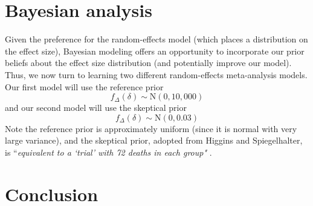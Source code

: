 \documentclass[fleqn,10pt]{SelfArx} %
\begin{document}

\section{Bayesian analysis}

Given the preference for the random-effects model (which places a distribution on the effect size), Bayesian modeling offers an opportunity to incorporate our prior beliefs about the effect size distribution (and potentially improve our model). Thus, we now turn to learning two different random-effects meta-analysis models. Our first model will use the reference prior
\[f_{\Delta}(\delta) \sim \textrm{N}(0, 10,000)\]
and our second model will use the skeptical prior
\[f_{\Delta}(\delta) \sim \textrm{N}(0, 0.03)\]
Note the reference prior is approximately uniform (since it is normal with very large variance), and the skeptical prior, adopted from Higgins  and Spiegelhalter, is ``\emph{equivalent to a `trial' with 72 deaths in each group"} \cite{Original}.




\section{Conclusion}





\end{document}
